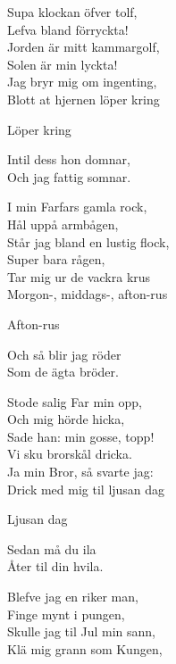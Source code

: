 \vspace{10pt}
Supa klockan öfver tolf,\\
Lefva bland förryckta!\\
Jorden är mitt kammargolf,\\
Solen är min lyckta!\\
Jag bryr mig om ingenting,\\
Blott at hjernen löper kring\par
\hspace{20pt}\revrpt Löper kring\rpt\hspace{5pt}{\footnotesize 4x}\par
Intil dess hon domnar,\\
Och jag fattig somnar.\par
\vspace{10pt}
I min Farfars gamla rock,\\
Hål uppå armbågen,\\
Står jag bland en lustig flock,\\
Super bara rågen,\\
Tar mig ur de vackra krus\\
Morgon-, middags-, afton-rus\par
\hspace{20pt}\revrpt Afton-rus\rpt\hspace{5pt}{\footnotesize 4x}\par
Och så blir jag röder\\
Som de ägta bröder.\par
\vspace{10pt}
Stode salig Far min opp,\\
Och mig hörde hicka,\\
Sade han: min gosse, topp!\\
Vi sku brorskål dricka.\\
Ja min Bror, så svarte jag:\\
Drick med mig til ljusan dag\par
\hspace{20pt}\revrpt Ljusan dag\rpt\hspace{5pt}{\footnotesize 4x}\par
Sedan må du ila\\
Åter til din hvila.\par
\newpage
Blefve jag en riker man,\\
Finge mynt i pungen,\\
Skulle jag til Jul min sann,\\
Klä mig grann som Kungen,\\
